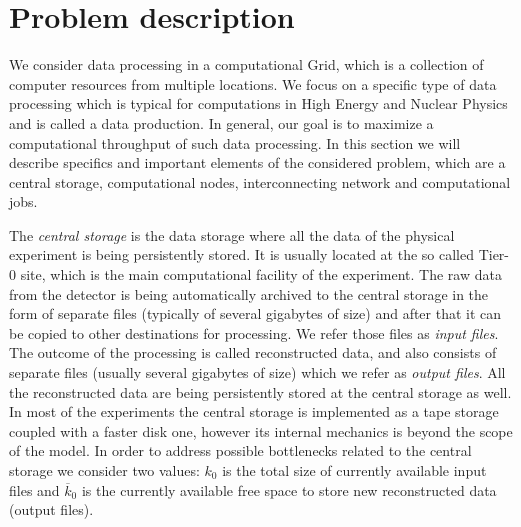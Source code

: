 \documentclass{svjour3}                     %
\begin{document}
\section{Problem description}
\label{problem}
We consider data processing in a computational Grid, which is a collection of computer resources from multiple locations.  We focus on a specific type of data processing which is typical for computations in High Energy and Nuclear Physics and is called a data production. In general, our goal is to maximize a computational throughput of such data processing. In this section we will describe specifics and important elements of the considered problem, which are a central storage, computational nodes, interconnecting network and computational jobs.

The \textit{central storage} is the data storage where all the data of the physical experiment is being persistently stored. It is usually located at the so called Tier-0 site, which is the main computational facility of the experiment.  The raw data from the detector is being automatically archived to the central storage in the form of separate files (typically of several gigabytes of size) and after that it can be copied to other destinations for processing. We refer those files as \textit{input files}. The outcome of the processing is called reconstructed data, and also consists of separate files (usually several gigabytes of size) which we refer as \textit{output files}. All the reconstructed data are being persistently stored at the central storage as well. In most of the experiments the central storage is implemented as a tape storage coupled with a faster disk one, however its internal mechanics is beyond the scope of the model. In order to address possible bottlenecks related to the central storage we consider two values: $k_{0}$ is the total size of currently available input files and $\overline{k}_{0}$ is the currently available free space to store new reconstructed data (output files).
\end{document}
